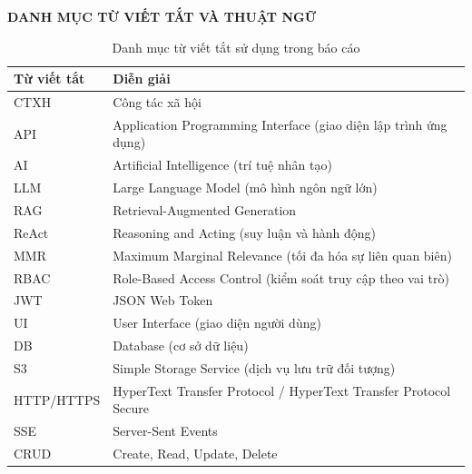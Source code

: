 \begin{center}
{\Large\bfseries DANH MỤC TỪ VIẾT TẮT VÀ THUẬT NGỮ}
\end{center}
\vspace{0.5em}

\thispagestyle{frontmatter}

\begin{table}[H]
\centering
\renewcommand{\arraystretch}{1.2}
\small
\begin{tabular}{|p{3.2cm}|p{10.8cm}|}
\hline
\textbf{Từ viết tắt} & \textbf{Diễn giải} \\
\hline
CTXH & Công tác xã hội \\
\hline
API & Application Programming Interface (giao diện lập trình ứng dụng) \\
\hline
AI & Artificial Intelligence (trí tuệ nhân tạo) \\
\hline
LLM & Large Language Model (mô hình ngôn ngữ lớn) \\
\hline
RAG & Retrieval-Augmented Generation \\
\hline
ReAct & Reasoning and Acting (suy luận và hành động) \\
\hline
MMR & Maximum Marginal Relevance (tối đa hóa sự liên quan biên) \\
\hline
RBAC & Role-Based Access Control (kiểm soát truy cập theo vai trò) \\
\hline
JWT & JSON Web Token \\
\hline
UI & User Interface (giao diện người dùng) \\
\hline
DB & Database (cơ sở dữ liệu) \\
\hline
S3 & Simple Storage Service (dịch vụ lưu trữ đối tượng) \\
\hline
HTTP/HTTPS & HyperText Transfer Protocol / HyperText Transfer Protocol Secure \\
\hline
SSE & Server-Sent Events \\
\hline
CRUD & Create, Read, Update, Delete \\
\hline
\end{tabular}
\caption{Danh mục từ viết tắt sử dụng trong báo cáo}
\end{table}

